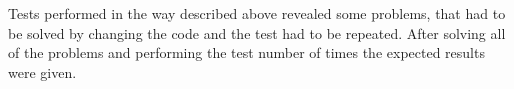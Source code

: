 Tests performed in the way described above revealed some problems, that had to be solved by changing the code and the test had to be repeated. After solving all of the problems and performing the test number of times the expected results were given.



